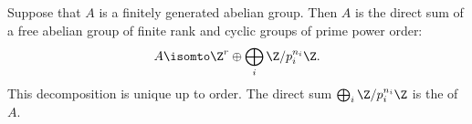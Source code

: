 \documentclass [preview, border = 20pt] {standalone}
\begin{document}
\pagecolor{black}
\color{white}
Suppose that $A$ is a finitely generated abelian group. Then $A$ is the direct sum of a free abelian group of finite rank and cyclic groups of prime power order:
\[
  A \isomto \Z^r \oplus \bigoplus_i \Z/p_i^{n_i}\Z.
\]
This decomposition is unique up to order. The direct sum $\bigoplus_i \Z/p_i^{n_i}\Z$ is the  of $A$.
\end{document}
